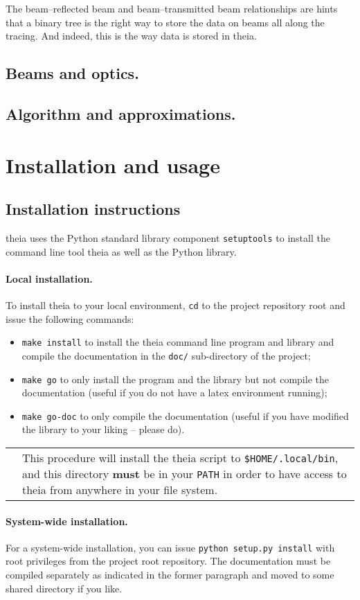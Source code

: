 \documentclass{article}
\renewcommand{\tt}[1]{\texttt{#1}}
\newcommand\dangersign[1][2ex]{%
  \renewcommand\stacktype{L}%
  \scaleto{\stackon[1.3pt]{\color{red}$\triangle$}{\tiny !}}{#1}%
}
\newcommand{\warn}[1]{\begin{center}
\begin{tabular}{ c  p{12cm} }
\dangersign[22pt] & \vspace{-0.6cm} #1
\end{tabular}
\end{center}}
\begin{document}
The beam--reflected beam and beam--transmitted beam relationships are hints that a binary tree is the right way to store the data on beams all along the tracing. And indeed, this is the way data is stored in theia.

\subsection{Beams and optics.}
\subsection{Algorithm and approximations.}

\section{Installation and usage}
\subsection{Installation instructions}
theia uses the Python standard library component \tt{setuptools} to install the command line tool theia as well as the Python library. 

\paragraph{Local installation.}To install theia to your local environment, \tt{cd} to the project repository root and issue the following commands:

\begin{itemize}
\item \tt{make install} to install the theia command line program and library and compile the documentation in the \tt{doc/} sub-directory of the project;
\item \tt{make go} to only install the program and the library but not compile the documentation (useful if you do not have a latex environment running);
\item \tt{make go-doc} to only compile the documentation (useful if you have modified the library to your liking -- please do).
\end{itemize}

\warn{This procedure will install the theia script to \tt{\$HOME/.local/bin}, and this directory \textbf{must} be in your \tt{PATH} in order to have access to theia from anywhere in your file system.}

\paragraph{System-wide installation.}For a system-wide installation, you can issue \tt{python setup.py install} with root privileges from the project root repository. The documentation must be compiled separately as indicated in the former paragraph and moved to some shared directory if you like.
\end{document}

